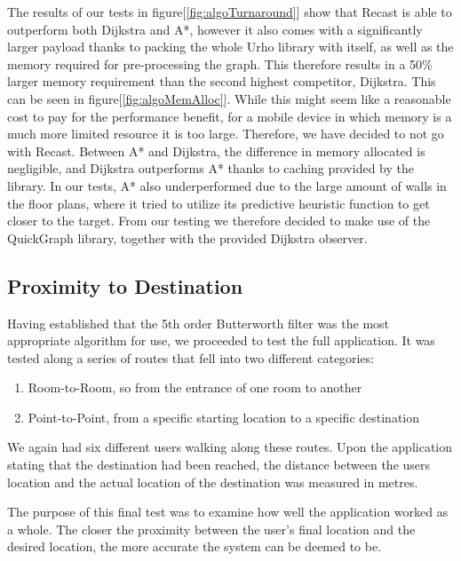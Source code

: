 \documentclass[12pt,a4paper]{report}
\begin{document}
The results of our tests in figure[\ref{fig:algoTurnaround}] show that Recast is able to outperform both Dijkstra and A*, however it also comes with a significantly larger payload thanks to packing the whole Urho library with itself, as well as the memory required for pre-processing the graph. This therefore results in a 50\% larger memory requirement than the second highest competitor, Dijkstra. This can be seen in figure[\ref{fig:algoMemAlloc}]. While this might seem like a reasonable cost to pay for the performance benefit, for a mobile device in which memory is a much more limited resource it is too large. Therefore, we have decided to not go with Recast. Between A* and Dijkstra, the difference in memory allocated is negligible, and Dijkstra outperforms A* thanks to caching provided by the library. In our tests, A* also underperformed due to the large amount of walls in the floor plans, where it tried to utilize its predictive heuristic function to get closer to the target. From our testing we therefore decided to make use of the QuickGraph library, together with the provided Dijkstra observer. 

\subsection{Proximity to Destination}

Having established that the 5th order Butterworth filter was the most appropriate algorithm for use, we proceeded to test the full application. It was tested along a series of routes that fell into two different categories:

\begin{enumerate}
	\item Room-to-Room, so from the entrance of one room to another  %
	\item Point-to-Point, from a specific starting location to a specific destination  %
\end{enumerate}

We again had six different users walking along these routes. Upon the application stating that the destination had been reached, the distance between the users location and the actual location of the destination was measured in metres.

The purpose of this final test was to examine how well the application worked as a whole. The closer the proximity between the user's final location and the desired location, the more accurate the system can be deemed to be.
\end{document}
